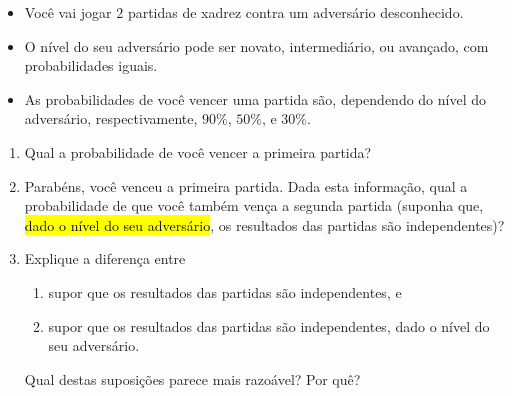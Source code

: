 \documentclass[
  11pt]{report}
\begin{document}
\begin{rmdbox}

\begin{itemize}
\item
  Você vai jogar $2$ partidas de xadrez contra um adversário desconhecido.
\item
  O nível do seu adversário pode ser novato, intermediário, ou avançado, com probabilidades iguais.
\item
  As probabilidades de você vencer uma partida são, dependendo do nível do adversário, respectivamente, $90\%$, $50\%$, e $30\%$.
\end{itemize}

\begin{enumerate}
\def\labelenumi{\alph{enumi}.}
\item
  Qual a probabilidade de você vencer a primeira partida?
\item
  Parabéns, você venceu a primeira partida. Dada esta informação, qual a probabilidade de que você também vença a segunda partida (suponha que, {\hl{dado o nível do seu adversário}}, os resultados das partidas são independentes)?
\item
  Explique a diferença entre

  \begin{enumerate}
  \def\labelenumii{\arabic{enumii}.}
  \item
    supor que os resultados das partidas são independentes, e
  \item
    supor que os resultados das partidas são independentes, dado o nível do seu adversário.
  \end{enumerate}

  Qual destas suposições parece mais razoável? Por quê?
\end{enumerate}

\end{rmdbox}
\end{document}
